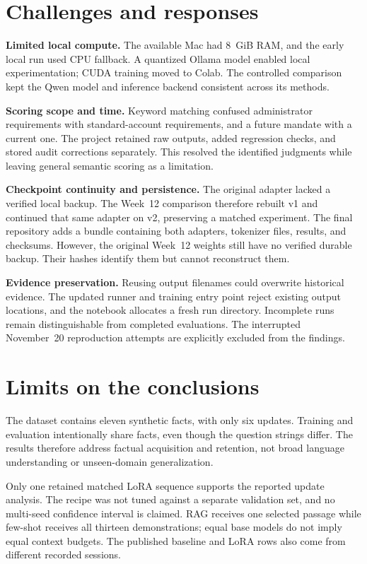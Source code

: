 \documentclass[11pt,letterpaper,oneside]{report}
\begin{document}
\section{Challenges and responses}
\textbf{Limited local compute.} The available Mac had 8~GiB RAM, and the early local run used CPU fallback. A quantized Ollama model enabled local experimentation; CUDA training moved to Colab. The controlled comparison kept the Qwen model and inference backend consistent across its methods.

\textbf{Scoring scope and time.} Keyword matching confused administrator requirements with standard-account requirements, and a future mandate with a current one. The project retained raw outputs, added regression checks, and stored audit corrections separately. This resolved the identified judgments while leaving general semantic scoring as a limitation.

\textbf{Checkpoint continuity and persistence.} The original adapter lacked a verified local backup. The Week~12 comparison therefore rebuilt v1 and continued that same adapter on v2, preserving a matched experiment. The final repository adds a bundle containing both adapters, tokenizer files, results, and checksums. However, the original Week~12 weights still have no verified durable backup. Their hashes identify them but cannot reconstruct them.

\textbf{Evidence preservation.} Reusing output filenames could overwrite historical evidence. The updated runner and training entry point reject existing output locations, and the notebook allocates a fresh run directory. Incomplete runs remain distinguishable from completed evaluations. The interrupted November~20 reproduction attempts are explicitly excluded from the findings.

\section{Limits on the conclusions}
The dataset contains eleven synthetic facts, with only six updates. Training and evaluation intentionally share facts, even though the question strings differ. The results therefore address factual acquisition and retention, not broad language understanding or unseen-domain generalization.

Only one retained matched LoRA sequence supports the reported update analysis. The recipe was not tuned against a separate validation set, and no multi-seed confidence interval is claimed. RAG receives one selected passage while few-shot receives all thirteen demonstrations; equal base models do not imply equal context budgets. The published baseline and LoRA rows also come from different recorded sessions.
\end{document}
